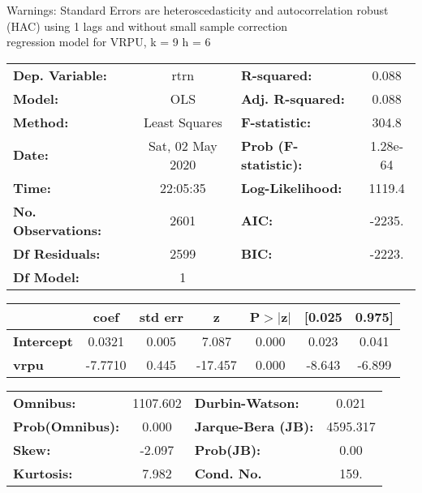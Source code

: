 Warnings: \newline
 [1] Standard Errors are heteroscedasticity and autocorrelation robust (HAC) using 1 lags and without small sample correction\\ 

regression model for VRPU, k = 9 h = 6\begin{center}
\begin{tabular}{lclc}
\toprule
\textbf{Dep. Variable:}    &       rtrn       & \textbf{  R-squared:         } &     0.088   \\
\textbf{Model:}            &       OLS        & \textbf{  Adj. R-squared:    } &     0.088   \\
\textbf{Method:}           &  Least Squares   & \textbf{  F-statistic:       } &     304.8   \\
\textbf{Date:}             & Sat, 02 May 2020 & \textbf{  Prob (F-statistic):} &  1.28e-64   \\
\textbf{Time:}             &     22:05:35     & \textbf{  Log-Likelihood:    } &    1119.4   \\
\textbf{No. Observations:} &        2601      & \textbf{  AIC:               } &    -2235.   \\
\textbf{Df Residuals:}     &        2599      & \textbf{  BIC:               } &    -2223.   \\
\textbf{Df Model:}         &           1      & \textbf{                     } &             \\
\bottomrule
\end{tabular}
\begin{tabular}{lcccccc}
                   & \textbf{coef} & \textbf{std err} & \textbf{z} & \textbf{P$> |$z$|$} & \textbf{[0.025} & \textbf{0.975]}  \\
\midrule
\textbf{Intercept} &       0.0321  &        0.005     &     7.087  &         0.000        &        0.023    &        0.041     \\
\textbf{vrpu}      &      -7.7710  &        0.445     &   -17.457  &         0.000        &       -8.643    &       -6.899     \\
\bottomrule
\end{tabular}
\begin{tabular}{lclc}
\textbf{Omnibus:}       & 1107.602 & \textbf{  Durbin-Watson:     } &    0.021  \\
\textbf{Prob(Omnibus):} &   0.000  & \textbf{  Jarque-Bera (JB):  } & 4595.317  \\
\textbf{Skew:}          &  -2.097  & \textbf{  Prob(JB):          } &     0.00  \\
\textbf{Kurtosis:}      &   7.982  & \textbf{  Cond. No.          } &     159.  \\
\bottomrule
\end{tabular}
\end{center}

